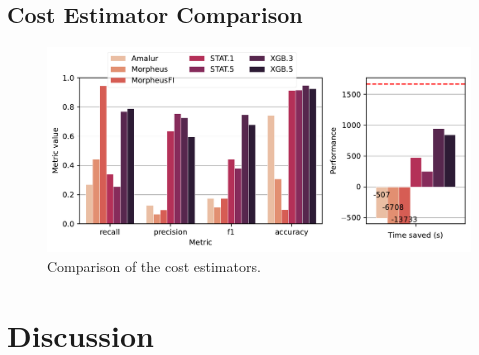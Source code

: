 \subsection{Cost Estimator Comparison}
\begin{figure}[ht]
  \centering
  \includegraphics[width=\linewidth]{chapters/06_evaluation/figures/eval_sota_results.pdf}
  \caption{Comparison of the cost estimators.}
  \label{fig:6-sota-comparison}
\end{figure}

\section{Discussion}
\label{sec:eval-discussion}

